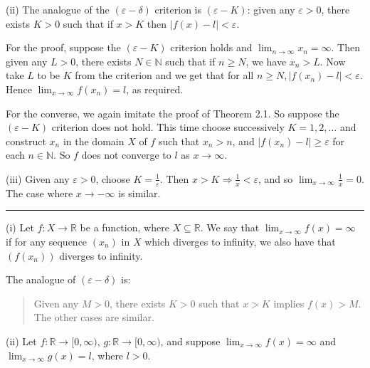 \documentclass[letterpaper,10pt,english]{jupyterBook}
\begin{document}
\sphinxAtStartPar
(ii) The analogue of the \((\varepsilon- \delta)\) criterion is \((\varepsilon-K)\): given any \(\varepsilon > 0\), there exists \(K > 0\) such that if \(x > K\) then \(|f(x) -l| < \varepsilon\).

For the proof, suppose the \((\varepsilon- K)\) criterion holds and \(\lim_{n\rightarrow\infty} x_{n} = \infty\). Then given any \(L > 0\), there exists \(N\in\mathbb{N}\) such that if \(n\geq N\), we have \(x_{n} > L\). Now take \(L\) to be \(K\) from the criterion and we get that for all \(n\geq N, |f(x_{n}) - l| < \varepsilon\). Hence \(\lim_{x \rightarrow \infty}f(x_{n}) = l\), as required.

For the converse, we again imitate the proof of Theorem 2.1. So suppose the \((\varepsilon-K)\) criterion does not hold. This time choose successively \(K = 1, 2, \ldots\) and construct \(x_{n}\) in the domain \(X\) of \(f\) such that \(x_{n} > n\), and \(|f(x_{n}) - l| \geq \varepsilon\) for each \(n\in\mathbb{N}\). So \(f\) does not converge to \(l\) as \(x\to\infty\).

\sphinxAtStartPar
(iii) Given any \(\varepsilon > 0\), choose \(K = \frac{1}{\varepsilon}\). Then \(x > K \Rightarrow \frac{1}{x} < \varepsilon\), and so \(\lim_{x\to\infty} \frac{1}{x}=0\). The case where \(x\to-\infty\) is similar.


\bigskip\hrule\bigskip


\sphinxAtStartPar
{\hyperref[\detokenize{Problems:id12}]{}}
(i) Let \(f:X\to\mathbb{R}\) be a function, where \(X\subseteq\mathbb{R}\). We say that \(\lim_{x \rightarrow \infty} f(x) = \infty\) if for any sequence \((x_{n})\) in \(X\) which diverges to infinity, we also have that \((f(x_{n}))\) diverges to infinity.

The analogue of \((\varepsilon - \delta)\) is:
\begin{quote}

\sphinxAtStartPar
Given any \(M > 0\), there exists \(K > 0\) such that \(x > K\) implies \(f(x) > M\).
The other cases are similar.
\end{quote}

\sphinxAtStartPar
(ii) Let \(f:\mathbb{R}\to[0,\infty)\), \(g:\mathbb{R}\to[0,\infty)\), and suppose \(\displaystyle\lim_{x\rightarrow\infty}f(x)=\infty\) and \(\displaystyle\lim_{x\rightarrow\infty}g(x)=l\), where \(l>0\).
\end{document}

